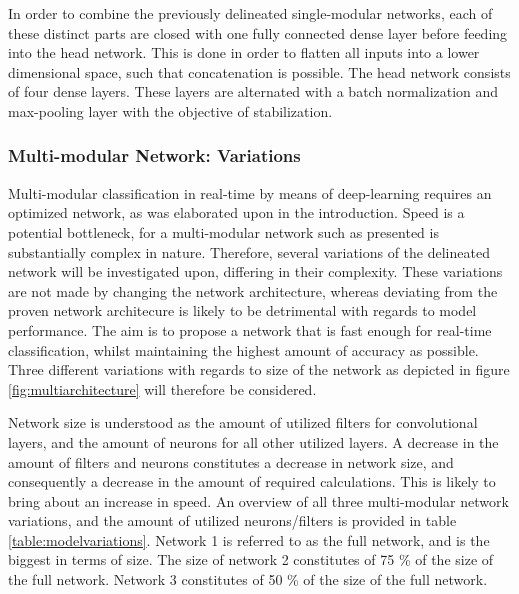 \documentclass[12pt]{article}
\begin{document}
In order to combine the previously delineated single-modular networks, each of these distinct parts are closed with one fully connected dense layer before feeding into the head network. This is done in order to flatten all inputs into a lower dimensional space, such that concatenation is possible. The head network consists of four dense layers. These layers are alternated with a batch normalization and max-pooling layer with the objective of stabilization. 

\subsubsection{Multi-modular Network: Variations}
Multi-modular classification in real-time by means of deep-learning requires an optimized network, as was elaborated upon in the introduction. Speed is a potential bottleneck, for a multi-modular network such as presented is substantially complex in nature. Therefore, several variations of the delineated network will be investigated upon, differing in their complexity. These variations are not made by changing the network architecture, whereas deviating from the proven network architecure is likely to be detrimental with regards to model performance. The aim is to propose a network that is fast enough for real-time classification, whilst maintaining the highest amount of accuracy as possible. Three different variations with regards to size of the network as depicted in figure \ref{fig:multiarchitecture} will therefore be considered.

Network size is understood as the amount of utilized filters for convolutional layers, and the amount of neurons for all other utilized layers. A decrease in the amount of filters and neurons constitutes a decrease in network size, and consequently a decrease in the amount of required calculations. This is likely to bring about an increase in speed. An overview of all three multi-modular network variations, and the amount of utilized neurons/filters is provided in table \ref{table:modelvariations}. Network 1 is referred to as the full network, and is the biggest in terms of size. The size of network 2 constitutes of 75 \% of the size of the full network. Network 3 constitutes of 50 \% of the size of the full network.
\end{document}
